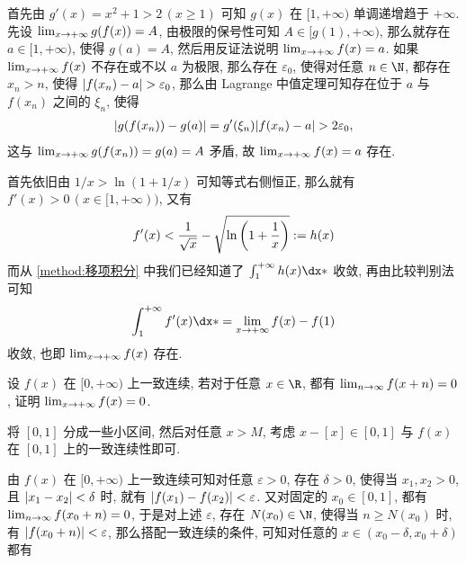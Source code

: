 \begin{exercise}[series=exer]
\begin{answer}
\begin{method}
          首先由 $ g'(x) = x^{2} + 1 > 2\,(x \ge 1) $ 可知 $ g(x) $ 在 $ [1, +\infty) $ 单调递增趋于 $ +\infty $. 先设 $ \lim_{x \to +\infty} g(f(x)) = A $, 由极限的保号性可知 $ A \in [g(1), +\infty) $, 那么就存在 $ a \in [1, +\infty) $, 使得 $ g(a) = A $, 然后用反证法说明 $ \lim_{x \to +\infty} f(x) = a $. 如果 $ \lim_{x \to +\infty}f(x) $ 不存在或不以 $ a $ 为极限, 那么存在 $ \varepsilon_{0} $, 使得对任意 $ n \in \N $, 都存在 $ x_{n} > n $, 使得 $ \abs{f(x_{n}) - a} > \varepsilon_{0} $, 那么由 Lagrange 中值定理可知存在位于 $ a $ 与 $ f(x_{n}) $ 之间的 $ \xi_{n} $, 使得
          \begin{align*}
              \abs{g(f(x_{n})) - g(a)} = g'(\xi_{n})\abs{f(x_{n}) - a} > 2\varepsilon_{0},
          \end{align*}
          这与 $ \lim_{x \to +\infty}g(f(x_{n})) = g(a) = A $ 矛盾, 故 $ \lim_{x \to +\infty} f(x) = a $ 存在.
          \item 首先依旧由 $ 1/x > \ln (1 + 1/x) $ 可知等式右侧恒正, 那么就有 $ f'(x) > 0\,(x \in [1, +\infty)) $, 又有
          \begin{align*}
              f'(x) < \frac{1}{\sqrt{x}} - \sqrt{\ln\qty(1 + \frac{1}{x})} := h(x)
          \end{align*}
          而从 \ref{method:移项积分} 中我们已经知道了 $ \int_{1}^{+\infty} h(x) \dx* $ 收敛, 再由比较判别法可知
          \begin{align*}
              \int_{1}^{+\infty} f'(x) \dx* = \limit{x}{+\infty}f(x) - f(1)
          \end{align*}
          收敛, 也即 $ \lim_{x \to +\infty} f(x) $ 存在.
      \end{method}
  \end{answer}
  \item\label{item:fx+n} 设 $ f(x) $ 在 $ [0, +\infty) $ 上一致连续, 若对于任意 $ x \in \R $, 都有 $ \lim_{n \to \infty} f(x + n) = 0 $, 证明 $ \lim_{x \to +\infty} f(x) = 0 $.
  \begin{hint}
      将 $ [0, 1] $ 分成一些小区间, 然后对任意 $ x > M $, 考虑 $ x - [x] \in [0, 1] $ 与 $ f(x) $ 在 $ [0, 1] $ 上的一致连续性即可.
  \end{hint}
  \begin{answer}
      由 $ f(x) $ 在 $ [0, +\infty) $ 上一致连续可知对任意 $ \varepsilon > 0 $, 存在 $ \delta > 0 $, 使得当 $ x_{1}, x_{2} > 0 $, 且 $ \abs{x_{1} - x_{2}} < \delta $ 时, 就有 $ \abs{f(x_{1}) - f(x_{2})} < \varepsilon $. 又对固定的 $ x_{0} \in [0, 1] $, 都有 $ \lim_{n \to \infty} f(x_{0} + n) = 0 $, 于是对上述 $ \varepsilon $, 存在 $ N(x_{0}) \in \N $, 使得当 $ n \ge N(x_{0}) $ 时, 有 $ \abs{f(x_{0} + n)} < \varepsilon $, 那么搭配一致连续的条件, 可知对任意的 $ x \in (x_{0} - \delta, x_{0} + \delta) $ 都有

\end{answer}
\end{exercise}
